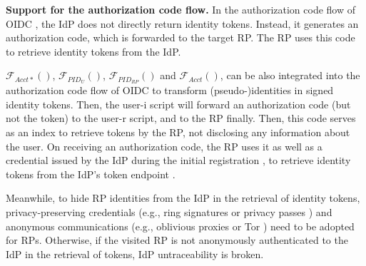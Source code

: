 



\noindent \textbf{Support for the authorization code flow.} In the authorization code flow of OIDC \cite{OpenIDConnect}, the IdP does not directly return identity tokens.
Instead, it generates an authorization code, which is forwarded to the target RP.
The RP uses this code to retrieve identity tokens from the IdP.

$\mathcal{F}_{Acct\ast}()$, $\mathcal{F}_{PID_{U}}()$, $\mathcal{F}_{PID_{RP}}()$ and $\mathcal{F}_{Acct}()$, can be also integrated into the authorization code flow of OIDC to transform (pseudo-)identities in signed identity tokens.
Then, the user-i script will forward an authorization code (but not the token) to the user-r script, and to the RP finally.
Then, this code serves as an index to retrieve tokens by the RP, not disclosing any information about the user.
On receiving an authorization code, the RP uses it as well as a credential issued by the IdP during the initial registration \cite{OpenIDConnect}, to retrieve identity tokens from the IdP's token endpoint \cite{rfc6749}.

Meanwhile, to hide RP identities from the IdP in the retrieval of identity tokens, privacy-preserving credentials
    (e.g., ring signatures \cite{ring-sig} or privacy passes \cite{privacypass,trusttoken})
 and anonymous communications (e.g., oblivious proxies \cite{ohttp-rfc} or Tor \cite{tor}) need to be adopted for RPs.
Otherwise, if the visited RP is not anonymously authenticated to the IdP in the retrieval of tokens,
    IdP untraceability is broken.

